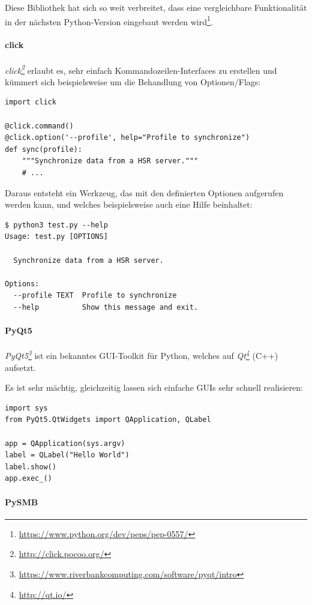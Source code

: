 \documentclass[a4paper]{article}
\newcommand{\tool}[2]{\emph{#1\footnote{\url{#2}}}}
\begin{document}
Diese Bibliothek hat sich so weit verbreitet, dass eine vergleichbare
Funktionalität in der nächsten Python-Version eingebaut werden wird\footnote{\url{https://www.python.org/dev/peps/pep-0557/}}.

\paragraph{click}

\tool{click}{http://click.pocoo.org/} erlaubt es, sehr einfach
Kommandozeilen-Interfaces zu erstellen und kümmert sich beispielsweise um die
Behandlung von Optionen/Flags:

\begin{verbatim}
import click

@click.command()
@click.option('--profile', help="Profile to synchronize")
def sync(profile):
    """Synchronize data from a HSR server."""
    # ...
\end{verbatim}

Daraus entsteht ein Werkzeug, das mit den definierten Optionen aufgerufen
werden kann, und welches beispielsweise auch eine Hilfe beinhaltet:

\begin{verbatim}
$ python3 test.py --help
Usage: test.py [OPTIONS]

  Synchronize data from a HSR server.

Options:
  --profile TEXT  Profile to synchronize
  --help          Show this message and exit.
\end{verbatim}

\paragraph{PyQt5}

\tool{PyQt5}{https://www.riverbankcomputing.com/software/pyqt/intro} ist ein
bekanntes GUI-Toolkit für Python, welches auf \tool{Qt}{http://qt.io/} (C++) aufsetzt.

Es ist sehr mächtig, gleichzeitig lassen sich einfache GUIs sehr schnell
realisieren:

\begin{verbatim}
import sys
from PyQt5.QtWidgets import QApplication, QLabel

app = QApplication(sys.argv)
label = QLabel("Hello World")
label.show()
app.exec_()
\end{verbatim}

\paragraph{PySMB}
\end{document}
